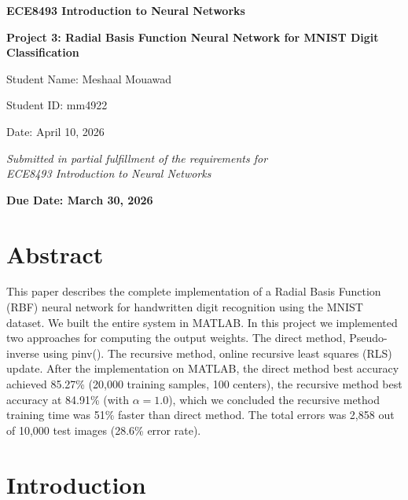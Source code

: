 \documentclass[12pt]{article}
\begin{document}
	
	\begin{titlepage}
		\centering
		\vspace*{2cm}
		\Huge
		\textbf{ECE8493 Introduction to Neural Networks}
		
		\vspace{1cm}
		\LARGE
		\textbf{Project 3: Radial Basis Function Neural Network for MNIST Digit Classification}

		
		\vspace{3cm}
		\Large
		Student Name: Meshaal Mouawad
		
		\vspace{0.5cm}
		Student ID: mm4922 
		
		\vspace{0.5cm}
		Date: April 10, 2026
		
		\vspace{3cm}
		\normalsize
		\textit{Submitted in partial fulfillment of the requirements for \\
			ECE8493 Introduction to Neural Networks}
		
		\vspace{1cm}
		\textbf{Due Date: March 30, 2026}
	\end{titlepage}
	
	\section*{Abstract}
	
	This paper describes the complete implementation of a Radial Basis Function (RBF) neural network for handwritten digit recognition using the MNIST dataset. We built the entire system in MATLAB. In this project we implemented two approaches for computing the output weights. The direct method, Pseudo-inverse using pinv(). The recursive method, online recursive least squares (RLS) update. After the implementation on MATLAB, the direct method best accuracy achieved 85.27\% (20,000 training samples, 100 centers), the recursive method best accuracy at 84.91\% (with $\alpha = 1.0$), which we concluded the recursive method training time was 51\% faster than direct method. The total errors was 2,858 out of 10,000 test images (28.6\% error rate).
	
	\newpage
	\tableofcontents
	\newpage
	
\section{Introduction}
\end{document}
